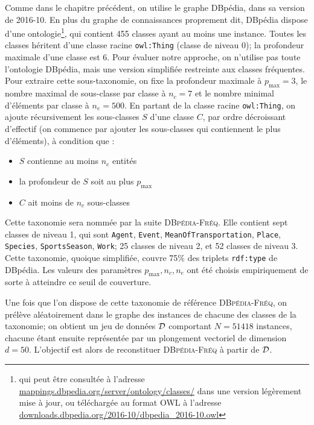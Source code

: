 Comme dans le chapitre précédent, on utilise le graphe DBpédia, dans sa version de 2016-10. En plus du graphe de connaissances proprement dit, DBpédia dispose d'une ontologie\footnote{qui peut être consultée à l'adresse \href{http://mappings.dbpedia.org/server/ontology/classes/}{mappings.dbpedia.org/server/ontology/classes/} dans une version légèrement mise à jour, ou téléchargée au format OWL à l'adresse \href{http://downloads.dbpedia.org/2016-10/dbpedia\_2016-10.owl}{downloads.dbpedia.org/2016-10/dbpedia\_2016-10.owl}}, qui contient 455 classes ayant au moins une instance. Toutes les classes héritent d'une classe racine \texttt{owl:Thing} (classe de niveau 0); la profondeur maximale d'une classe est 6. Pour évaluer notre approche, on n'utilise pas toute l'ontologie DBpédia, mais une version simplifiée restreinte aux classes fréquentes. %
Pour extraire cette sous-taxonomie, on fixe la profondeur maximale à $p_{\max}=3$, le nombre maximal de sous-classe par classe à $n_c=7$ et le nombre minimal d'éléments par classe à $n_e=500$. En partant de la classe racine \texttt{owl:Thing}, on ajoute récursivement les sous-classes $S$ d'une classe $C$, par ordre décroissant d'effectif (on commence par ajouter les sous-classes qui contiennent le plus d'éléments), à condition que : 
\begin{itemize}
    \item $S$ contienne au moins $n_e$ entités
    \item la profondeur de $S$ soit au plus $p_{\max}$
    \item $C$ ait moins de $n_c$ sous-classes
\end{itemize}

Cette taxonomie sera nommée par la suite \textsc{DBpédia-Fréq}. Elle contient sept classes de niveau 1, qui sont \texttt{Agent}, \texttt{Event}, \texttt{MeanOfTransportation}, \texttt{Place}, \texttt{Species}, \texttt{SportsSeason}, \texttt{Work}; 25 classes de niveau 2, et 52 classes de niveau 3. Cette taxonomie, quoique simplifiée, couvre 75\% des triplets \texttt{rdf:type} de DBpédia. Les valeurs des paramètres $p_{\max}, n_c, n_e$ ont été choisis empiriquement de sorte à atteindre ce seuil de couverture. 

Une fois que l'on dispose de cette taxonomie de référence \textsc{DBpédia-Fréq}, on prélève aléatoirement dans le graphe des instances de chacune des classes de la taxonomie; on obtient un jeu de données $\cal{D}$ comportant $N = 51 418$ instances, chacune étant ensuite représentée par un plongement vectoriel de dimension $d=50$. L'objectif est alors de reconstituer \textsc{DBpédia-Fréq} à partir de $\cal{D}$.


